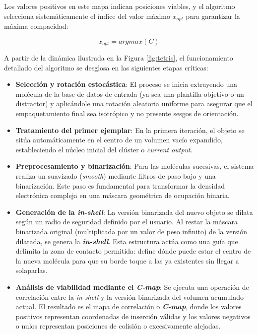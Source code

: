Los valores positivos en este mapa indican posiciones viables, y el algoritmo selecciona sistemáticamente el índice del valor máximo $x_{opt}$ para garantizar la máxima compacidad:

\begin{equation}
x_{opt} = argmax(C)
\end{equation}

A partir de la dinámica ilustrada en la Figura \ref{fig:tetris}, el funcionamiento detallado del algoritmo se desglosa en las siguientes etapas críticas:

\begin{itemize}
    \item \textbf{Selección y rotación estocástica}: El proceso se inicia extrayendo una molécula de la base de datos de entrada (ya sea una plantilla objetivo o un distractor) y aplicándole una rotación aleatoria uniforme para asegurar que el empaquetamiento final sea isotrópico y no presente sesgos de orientación.
    
    \item \textbf{Tratamiento del primer ejemplar}: En la primera iteración, el objeto se sitúa automáticamente en el centro de un volumen vacío expandido, estableciendo el núcleo inicial del clúster o \textit{current output}.
    
    \item \textbf{Preprocesamiento y binarización}: Para las moléculas sucesivas, el sistema realiza un suavizado (\textit{smooth}) mediante filtros de paso bajo y una binarización. Este paso es fundamental para transformar la densidad electrónica compleja en una máscara geométrica de ocupación binaria.
    
    \item \textbf{Generación de la \textit{in-shell}}: La versión binarizada del nuevo objeto se dilata según un radio de seguridad definido por el usuario. Al restar la máscara binarizada original (multiplicada por un valor de peso infinito) de la versión dilatada, se genera la \textbf{\textit{in-shell}}. Esta estructura actúa como una guía que delimita la zona de contacto permitida: define dónde puede estar el centro de la nueva molécula para que su borde toque a las ya existentes sin llegar a solaparlas.
    
    \item \textbf{Análisis de viabilidad mediante el \textit{C-map}}: Se ejecuta una operación de correlación entre la \textit{in-shell} y la versión binarizada del volumen acumulado actual. El resultado es el mapa de correlación o \textbf{\textit{C-map}}, donde los valores positivos representan coordenadas de inserción válidas y los valores negativos o nulos representan posiciones de colisión o excesivamente alejadas.
    

\end{itemize}
